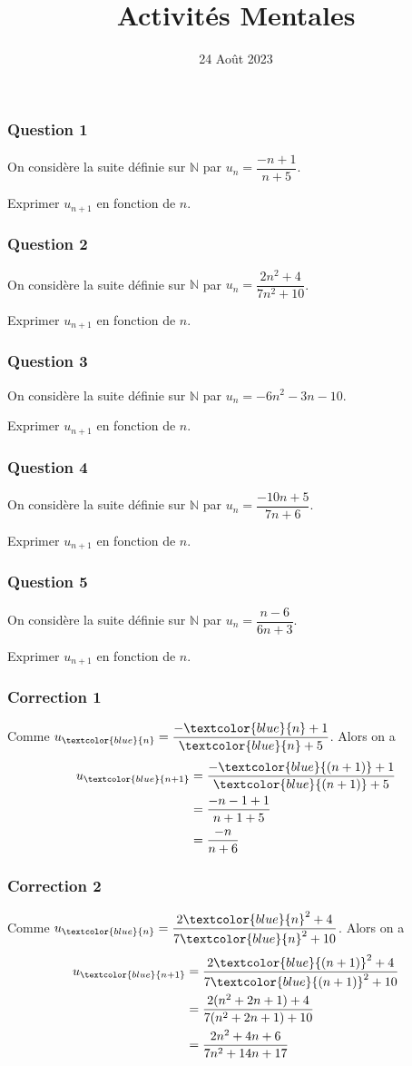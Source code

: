 \documentclass[15pt, mathserif]{beamer}
\title{Activités Mentales}
\date{24 Août 2023}
\newcommand{\N}{\mathbb{N}}			%
\begin{document}
\begin{frame}
    \titlepage
\end{frame}

\begin{frame} 
	\frametitle{Question 1}
On considère la suite définie sur $\N$ par $u_n=\dfrac{-n+1}{n+5}$. 
 
 Exprimer $u_{n+1}$ en fonction de $n$.\end{frame}


\begin{frame} 
	\frametitle{Question 2}
On considère la suite définie sur $\N$ par $u_n=\dfrac{2n^2+4}{7n^2+10}$. 
 
 Exprimer $u_{n+1}$ en fonction de $n$.\end{frame}


\begin{frame} 
	\frametitle{Question 3}
On considère la suite définie sur $\N$ par $u_n=-6n^2-3n-10$. 
 
 Exprimer $u_{n+1}$ en fonction de $n$.\end{frame}


\begin{frame} 
	\frametitle{Question 4}
On considère la suite définie sur $\N$ par $u_n=\dfrac{-10n+5}{7n+6}$. 
 
 Exprimer $u_{n+1}$ en fonction de $n$.\end{frame}


\begin{frame} 
	\frametitle{Question 5}
On considère la suite définie sur $\N$ par $u_n=\dfrac{n-6}{6n+3}$. 
 
 Exprimer $u_{n+1}$ en fonction de $n$.\end{frame}


\begin{frame}
\vspace{-10mm}
	\frametitle{Correction 1}
Comme $u_{\textcolor{blue}{n}}=\dfrac{-\textcolor{blue}{n}+1}{\textcolor{blue}{n}+5}$. Alors on a \begin{align*} 
 u_{\textcolor{blue}{n+1}} &=\dfrac{-\textcolor{blue}{(n+1)}+1}{\textcolor{blue}{(n+1)}+5} \\ 
 &= \dfrac{-n-1+1}{n+1+5} \\ 
 &= \dfrac{-n}{n+6}
 \end{align*}\end{frame}


\begin{frame}
\vspace{-10mm}
	\frametitle{Correction 2}
Comme $u_{\textcolor{blue}{n}}=\dfrac{2\textcolor{blue}{n}^2+4}{7\textcolor{blue}{n}^2+10}$. Alors on a \begin{align*} 
 u_{\textcolor{blue}{n+1}} &=\dfrac{2\textcolor{blue}{(n+1)}^2+4}{7\textcolor{blue}{(n+1)}^2+10} \\ 
 &= \dfrac{2(n^2+2n+1)+4}{7(n^2+2n+1)+10} \\ 
 &= \dfrac{2n^2+4n+6}{7n^2+14n+17}
 \end{align*}\end{frame}
\end{document}

